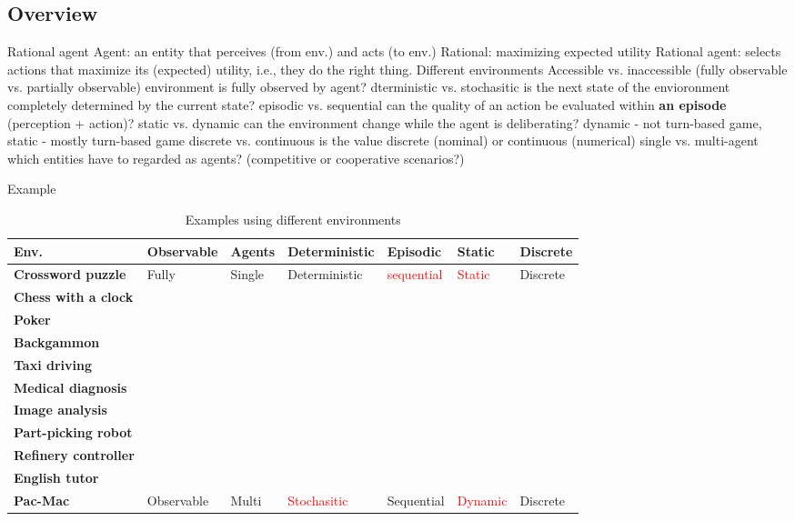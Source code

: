 \subsection{Overview}
\begin{outline}
    \1 Rational agent
        \2 Agent: an entity that perceives (from env.) and acts (to env.)
        \2 Rational: maximizing expected utility
        \2 Rational agent: selects actions that maximize its (expected) utility, i.e., they do the right thing.
    \1 Different environments
        \2 Accessible vs. inaccessible (fully observable vs. partially observable)
            \3 environment is fully observed by agent?
        \2 dterministic vs. stochasitic 
            \3 is the next state of the envioronment completely determined by the current state?
        \2 episodic vs. sequential
            \3 can the quality of an action be evaluated within \textbf{an episode} (perception + action)?
        \2 static vs. dynamic
            \3 can the environment change while the agent is deliberating?
            \3 dynamic - not turn-based game, static - mostly turn-based game
        \2 discrete vs. continuous
            \3 is the value discrete (nominal) or continuous (numerical)
        \2 single vs. multi-agent
            \3 which entities have to regarded as agents? (competitive or cooperative scenarios?)
\end{outline}

Example 
\begin{table}[htbp]\footnotesize
    \centering
    \caption{Examples using different environments}
    \begin{tabularx}{15cm}{X|XXXXXX}
    \toprule
    \textbf{Env.}&\textbf{Observable}&\textbf{Agents}&\textbf{Deterministic}&\textbf{Episodic}&\textbf{Static}&\textbf{Discrete} \\
    \hline
    \textbf{Crossword puzzle}&Fully&Single&Deterministic&\textcolor{red}{sequential}&\textcolor{red}{Static}&Discrete \\
    \hline
    \textbf{Chess with a clock}&&&&&& \\
    \hline
    \textbf{Poker}&&&&&& \\
    \hline
    \textbf{Backgammon}&&&&&& \\
    \hline
    \textbf{Taxi driving}&&&&&& \\
    \hline
    \textbf{Medical diagnosis}&&&&&& \\
    \hline
    \textbf{Image analysis}&&&&&& \\
    \hline
    \textbf{Part-picking robot}&&&&&& \\
    \hline
    \textbf{Refinery controller}&&&&&& \\
    \hline
    \textbf{English tutor}&&&&&& \\
    \hline
    \textbf{Pac-Mac}&Observable&Multi&\textcolor{red}{Stochasitic}&Sequential&\textcolor{red}{Dynamic}&Discrete \\
    \bottomrule
    \end{tabularx}
    \label{tab:diff_classification_association_rules}
\end{table}

